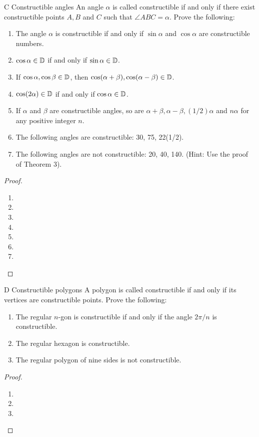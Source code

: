 \begin{exercise}{C Constructible angles}
An angle $\alpha$ is called constructible if and only if there exist constructible points $A,B$ and $C$ such that $\angle ABC=\alpha$. Prove the following:
\begin{enumerate}
    \item The angle $\alpha$ is constructible if and only if $\sin\alpha$ and $\cos\alpha$ are constructible numbers.
    \item $\cos\alpha\in\mathbb{D}$ if and only if $\sin\alpha\in\mathbb{D}$.
    \item If $\cos\alpha,\cos\beta\in\mathbb{D}$, then $\cos(\alpha+\beta),\cos(\alpha-\beta)\in\mathbb{D}$.
     \item $\cos(2\alpha)\in\mathbb{D}$ if and only if $\cos\alpha\in\mathbb{D}$.
     \item If $\alpha$ and $\beta$ are constructible angles, so are $\alpha+\beta,\alpha-\beta,(1/2)\alpha$ and $n\alpha$ for any positive integer $n$.
     \item The following angles are constructible: 30\degree, 75\degree, 22(1/2)\degree.
     \item The following angles are not constructible: 20\degree, 40\degree, 140\degree. (Hint: Use the proof of Theorem 3).
\end{enumerate}
\end{exercise}
\begin{proof}
 \begin{enumerate}
     \item 
    \item
    \item 
     \item
     \item
     \item 
     \item
 \end{enumerate}
\end{proof}

\begin{exercise}{D Constructible polygons}
A polygon is called constructible if and only if its vertices are constructible points. Prove the following:
\begin{enumerate}
    \item The regular $n$-gon is constructible if and only if the angle $2\pi/n$ is constructible. 
    \item The regular hexagon is constructible.
    \item The regular polygon of nine sides is not constructible.
\end{enumerate}
\end{exercise}
\begin{proof}
 \begin{enumerate}
     \item 
     \item
     \item
 \end{enumerate}
\end{proof}

